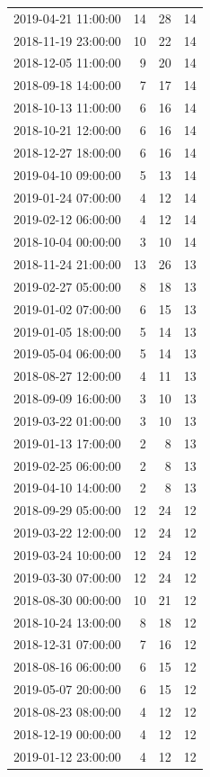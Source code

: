 \begin{tabular}{lrrr}
2019-04-21 11:00:00 & 14 & 28 & 14 \\
2018-11-19 23:00:00 & 10 & 22 & 14 \\
2018-12-05 11:00:00 & 9 & 20 & 14 \\
2018-09-18 14:00:00 & 7 & 17 & 14 \\
2018-10-13 11:00:00 & 6 & 16 & 14 \\
2018-10-21 12:00:00 & 6 & 16 & 14 \\
2018-12-27 18:00:00 & 6 & 16 & 14 \\
2019-04-10 09:00:00 & 5 & 13 & 14 \\
2019-01-24 07:00:00 & 4 & 12 & 14 \\
2019-02-12 06:00:00 & 4 & 12 & 14 \\
2018-10-04 00:00:00 & 3 & 10 & 14 \\
2018-11-24 21:00:00 & 13 & 26 & 13 \\
2019-02-27 05:00:00 & 8 & 18 & 13 \\
2019-01-02 07:00:00 & 6 & 15 & 13 \\
2019-01-05 18:00:00 & 5 & 14 & 13 \\
2019-05-04 06:00:00 & 5 & 14 & 13 \\
2018-08-27 12:00:00 & 4 & 11 & 13 \\
2018-09-09 16:00:00 & 3 & 10 & 13 \\
2019-03-22 01:00:00 & 3 & 10 & 13 \\
2019-01-13 17:00:00 & 2 & 8 & 13 \\
2019-02-25 06:00:00 & 2 & 8 & 13 \\
2019-04-10 14:00:00 & 2 & 8 & 13 \\
2018-09-29 05:00:00 & 12 & 24 & 12 \\
2019-03-22 12:00:00 & 12 & 24 & 12 \\
2019-03-24 10:00:00 & 12 & 24 & 12 \\
2019-03-30 07:00:00 & 12 & 24 & 12 \\
2018-08-30 00:00:00 & 10 & 21 & 12 \\
2018-10-24 13:00:00 & 8 & 18 & 12 \\
2018-12-31 07:00:00 & 7 & 16 & 12 \\
2018-08-16 06:00:00 & 6 & 15 & 12 \\
2019-05-07 20:00:00 & 6 & 15 & 12 \\
2018-08-23 08:00:00 & 4 & 12 & 12 \\
2018-12-19 00:00:00 & 4 & 12 & 12 \\
2019-01-12 23:00:00 & 4 & 12 & 12 \\

\end{tabular}
